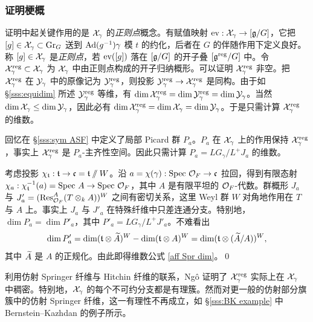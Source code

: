 \subsubsection{证明梗概}\label{dim formula discussion} 证明中起关键作用的是 $\mathcal{X}_{\gamma}$ 的{\em 正则点}概念。有赋值映射 $\textup{ev}: \mathcal{X}_{\gamma}\to [\mathfrak{g}/G]$，它把 $[g]\in\mathcal{X}_{\gamma}\subset \textup{Gr}_{G}$ 送到 $\textup{Ad}(g^{-1})\gamma$ 模 $t$ 的约化，后者在 $G$ 的伴随作用下定义良好。称 $[g]\in \mathcal{X}_{\gamma}$ 是{\em 正则点}，若 $\textup{ev}([g])$ 落在 $[\mathfrak{g}/G]$ 的开子叠 $[\mathfrak{g}^{\textup{reg}}/G]$ 中。令 $\mathcal{X}^{\textup{reg}}_{\gamma}\subset\mathcal{X}_{\gamma}$ 为 $\mathcal{X}_{\gamma}$ 中由正则点构成的开子归纳概形。可以证明 $\mathcal{X}^{\textup{reg}}_{\gamma}$ 非空。把 $\mathcal{X}^{\textup{reg}}_{\gamma}$ 在 $\mathcal{Y}_{\gamma}$ 中的原像记为 $\mathcal{Y}^{\textup{reg}}_{\gamma}$，则投影 $\mathcal{Y}^{\textup{reg}}_{\gamma}\to\mathcal{X}^{\textup{reg}}_{\gamma}$ 是同构。由于如 \S\ref{sss:equidim} 所述 $\mathcal{Y}^{\textup{reg}}_{\gamma}$ 等维，有 $\dim\mathcal{X}^{\textup{reg}}_{\gamma}=\dim\mathcal{Y}^{\textup{reg}}_{\gamma}=\dim\mathcal{Y}_{\gamma}$。当然 $\dim\mathcal{X}_{\gamma}\leq\dim \mathcal{Y}_{\gamma}$，因此必有 $\dim \mathcal{X}^{\textup{reg}}_{\gamma}=\dim \mathcal{X}_{\gamma}=\dim \mathcal{Y}_{\gamma}$。于是只需计算 $\mathcal{X}^{\textup{reg}}_{\gamma}$ 的维数。

回忆在 \S\ref{sss:sym ASF} 中定义了局部 Picard 群 $P_{a}$。$P_{a}$ 在 $\mathcal{X}_{\gamma}$ 上的作用保持 $\mathcal{X}^{\textup{reg}}_{\gamma}$，事实上 $\mathcal{X}^{\textup{reg}}_{\gamma}$ 是 $P_{a}$-主齐性空间。因此只需计算 $P_{a}=LG_{\gamma}/L^{+}J_{a}$ 的维数。

考虑投影 $\chi_{\mathfrak{t}}: \mathfrak{t}\to\mathfrak{c}=\mathfrak{t}\sslash W$。沿 $a=\chi(\gamma):\textup{Spec}\ \mathcal{O}_{F}\to\mathfrak{c}$ 拉回，得到有限态射 $\chi_{a}: \chi^{-1}_{\mathfrak{t}}(a)=\textup{Spec}\  A\to \textup{Spec}\ \mathcal{O}_{F}$，其中 $A$ 是有限平坦的 $\mathcal{O}_{F}$-代数。群概形 $J_{a}$ 与 $J'_{a}=(\textup{Res}^{A}_{\mathcal{O}_{F}}(T\otimes_{k}A))^{W}$ 之间有密切关系，这里 Weyl 群 $W$ 对角地作用在 $T$ 与 $A$ 上。事实上 $J_{a}$ 与 $J'_{a}$ 在特殊纤维中只差连通分支。特别地，$\dim P_{a}=\dim P'_{a}$，其中 $P'_{a}=LG_{\gamma}/L^{+}J'_{a}$。不难看出
\begin{equation*}
\dim P'_{a}=\dim (\mathfrak{t}\otimes \widetilde{A})^{W}-\dim (\mathfrak{t}\otimes A)^{W}=\dim (\mathfrak{t}\otimes (\widetilde{A}/A))^{W},
\end{equation*}
其中 $\widetilde{A}$ 是 $A$ 的正规化。由此即得维数公式 \eqref{aff Spr dim}。\qed

\begin{remark} 利用仿射 Springer 纤维与 Hitchin 纤维的联系，Ng\^o \cite[推论 4.16.2]{NgoFL} 证明了 $\mathcal{X}^{\textup{reg}}_{\gamma}$ 实际上在 $\mathcal{X}_{\gamma}$ 中稠密。特别地，$\mathcal{X}_{\gamma}$ 的每个不可约分支都是有理簇。然而对更一般的仿射部分旗簇中的仿射 Springer 纤维，这一有理性不再成立，如 \S\ref{sss:BK example} 中 Bernstein--Kazhdan 的例子所示。
\end{remark}

